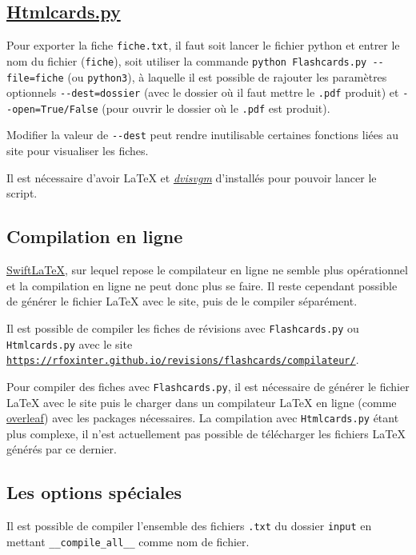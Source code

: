 \documentclass[a4paper,12pt]{article}
\begin{document}
\subsection[Htmlcards.py]{\href{https://raw.githubusercontent.com/rfoxinter/revisions/refs/heads/main/output/Htmlcards.py}{\color{black}Htmlcards.py}}
Pour exporter la fiche \texttt{fiche.txt}, il faut soit lancer le fichier python et entrer le nom du fichier (\texttt{fiche}), soit utiliser la commande \texttt{python Flashcards.py -{}-file=fiche} (ou \texttt{python3}), à laquelle il est possible de rajouter les paramètres optionnels \texttt{-{}-dest=dossier} (avec le dossier où il faut mettre le \texttt{.pdf} produit) et \texttt{-{}-open=True/False} (pour ouvrir le dossier où le \texttt{.pdf} est produit).

Modifier la valeur de \texttt{-{}-dest} peut rendre inutilisable certaines fonctions liées au site pour visualiser les fiches.

Il est nécessaire d'avoir \LaTeX{} et \href{https://ctan.org/pkg/dvisvgm/}{\color{black}\textsl{dvisvgm}} d'installés pour pouvoir lancer le script.

\subsection{Compilation en ligne}
\href{https://www.swiftlatex.com}{\color{black}Swift\LaTeX}, sur lequel repose le compilateur en ligne ne semble plus opérationnel et la compilation en ligne ne peut donc plus se faire. Il reste cependant possible de générer le fichier \LaTeX{} avec le site, puis de le compiler séparément.

Il est possible de compiler les fiches de révisions avec \texttt{Flashcards.py} ou \texttt{Htmlcards.py} avec le site \href{https://rfoxinter.github.io/revisions/flashcards/compilateur/}{\texttt{https://rfoxinter.github.io/revisions/flashcards/compilateur/}}.

Pour compiler des fiches avec \texttt{Flashcards.py}, il est nécessaire de générer le fichier \LaTeX{} avec le site puis le charger dans un compilateur \LaTeX{} en ligne (comme \href{https://www.overleaf.com/}{overleaf}) avec les packages nécessaires. La compilation avec \texttt{Htmlcards.py} étant plus complexe, il n'est actuellement pas possible de télécharger les fichiers \LaTeX{} générés par ce dernier.
\subsection{Les options spéciales}
Il est possible de compiler l'ensemble des fichiers \texttt{.txt} du dossier \texttt{input} en mettant \texttt{\_\_compile\_all\_\_} comme nom de fichier.
\end{document}
